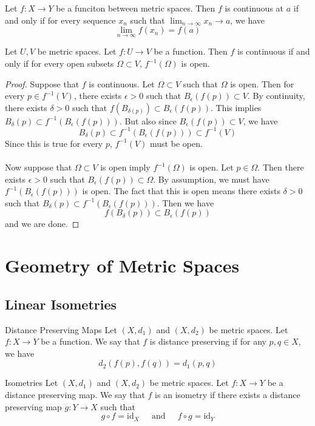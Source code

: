 \documentclass[a4paper]{article}
\begin{document}
\begin{prp}{}{} Let $f:X\to Y$ be a funciton between metric spaces. Then $f$ is continuous at $a$ if and only if for every sequence $x_n$ such that $\lim_{n\to\infty}x_n\to a$, we have $$\lim_{n\to\infty}f(x_n)=f(a)$$
\end{prp}

\begin{thm}{}{} Let $U,V$ be metric spaces. Let $f:U\to V$ be a function. Then $f$ is continuous if and only if for every open subsets $\Omega\subset V$, $f^{-1}(\Omega)$ is open. \tcbline
\begin{proof} Suppose that $f$ is continuous. Let $\Omega\subset V$ such that $\Omega$ is open. Then for every $p\in f^{-1}(V)$, there exists $\epsilon>0$ such that $B_{\epsilon}(f(p))\subset V$. By continuity, there exists $\delta>0$ such that $f(B_{\delta(p)})\subset B_{\epsilon}(f(p))$. This implies $B_{\delta}(p)\subset f^{-1}(B_{\epsilon}(f(p)))$. But also since $B_{\epsilon}(f(p))\subset V$, we have $$B_{\delta}(p)\subset f^{-1}(B_{\epsilon}(f(p)))\subset f^{-1}(V)$$ Since this is true for every $p$, $f^{-1}(V)$ must be open. \\~\\
Now suppose that $\Omega\subset V$ is open imply $f^{-1}(\Omega)$ is open. Let $p\in \Omega$. Then there exists $\epsilon>0$ such that $B_{\epsilon}(f(p))\subset\Omega$. By assumption, we must have $f^{-1}(B_{\epsilon}(f(p)))$ is open. The fact that this is open means there exists $\delta>0$ such that $B_{\delta}(p)\subset f^{-1}(B_{\epsilon}(f(p)))$. Then we have $$f(B_{\delta}(p))\subset B_{\epsilon}(f(p))$$
and we are done. 
\end{proof}
\end{thm}

\pagebreak
\section{Geometry of Metric Spaces}
\subsection{Linear Isometries}
\begin{defn}{Distance Preserving Maps}{} Let $(X,d_1)$ and $(X,d_2)$ be metric spaces. Let $f:X\to Y$ be a function. We say that $f$ is distance preserving if for any $p,q\in X$, we have $$d_2(f(p),f(q))=d_1(p,q)$$
\end{defn}

\begin{defn}{Isometries}{} Let $(X,d_1)$ and $(X,d_2)$ be metric spaces. Let $f:X\to Y$ be a distance preserving map. We say that $f$ is an isometry if there exists a distance preserving map $g:Y\to X$ such that $$g\circ f=\text{id}_X\;\;\;\;\text{ and }\;\;\;\;f\circ g=\text{id}_Y$$
\end{defn}
\end{document}

